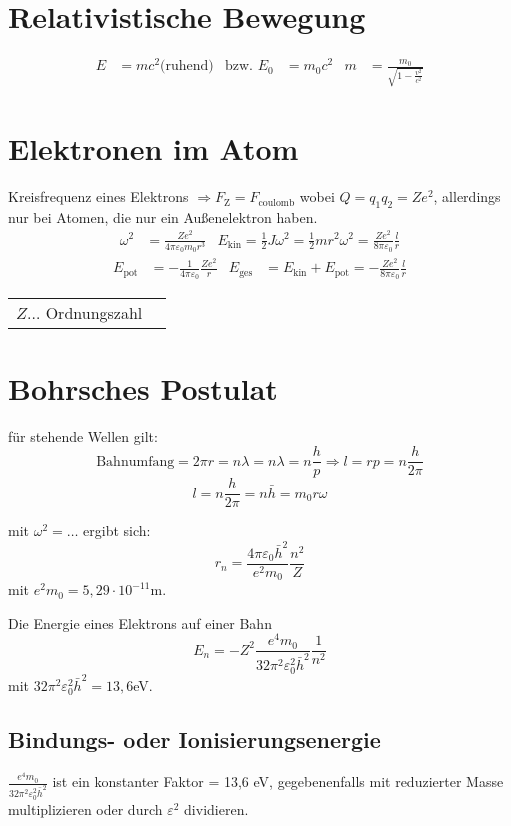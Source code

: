 	\section{Relativistische Bewegung}
		\begin{align*}
			E &= mc^2\text{(ruhend)} & \text{bzw. } E_0 &= m_0c^2 & m &= \frac{m_0}{\sqrt{1-\frac{v^2}{c^2}}}
		\end{align*}

	\section{Elektronen im Atom}
		Kreisfrequenz eines Elektrons $\Rightarrow F_{\text{Z}}=F_{\text{coulomb}}$ 
		wobei $Q=q_1q_2=Ze^2$, allerdings nur bei Atomen, die nur ein Außenelektron haben.
		\begin{align*}
			\omega^2 &= \frac{Ze^2}{4\pi\varepsilon_0m_0r^3} 
			& E_{\text{kin}}=\frac{1}{2}J\omega^2=\frac{1}{2}mr^2\omega^2=\frac{Ze^2}{8\pi\varepsilon_0}\frac{l}{r}
		\end{align*}
		\begin{align*}
			E_{\text{pot}} &= -\frac{1}{4\pi\varepsilon_0}\frac{Ze^2}{r} 
			& E_{\text{ges}} &= E_{\text{kin}}+E_{\text{pot}} = -\frac{Ze^2}{8\pi\varepsilon_0}\frac{l}{r}
		\end{align*}
	
		\begin{table}[h]
		\begin{tabular}{ll}
		$Z\dots$ Ordnungszahl\\
		\end{tabular}
		\end{table}
	\section{Bohrsches Postulat}
		für stehende Wellen gilt:
		\[
			\text{Bahnumfang} = 2\pi r = n\lambda = n\lambda = n\frac{h}{p} \Rightarrow l = rp = n\frac{h}{2\pi}
		\]
		\[
			l = n\frac{h}{2\pi} = n\bar{h} = m_0r\omega
		\]

		mit $\omega^2=\dots$ ergibt sich:
		\[
			r_n=\frac{4\pi\varepsilon_0\bar{h}^2}{e^2m_0}\frac{n^2}{Z}
		\]
		mit $e^2m_0=5,29\cdot10^{-11}$m.

		Die Energie eines Elektrons auf einer Bahn
		\[
			E_n=-Z^2\frac{e^4m_0}{32\pi^2\varepsilon_0^2\bar{h}^2}\frac{1}{n^2}
		\]
		mit $32\pi^2\varepsilon_0^2\bar{h}^2=13,6$eV.

		\subsection{Bindungs- oder Ionisierungsenergie}
		$\frac{e^4m_0}{32\pi^2\varepsilon_0^2\bar{h}^2}$ ist ein konstanter Faktor = 13,6 eV, gegebenenfalls 
		mit reduzierter Masse multiplizieren oder durch $\varepsilon^2$ dividieren.

